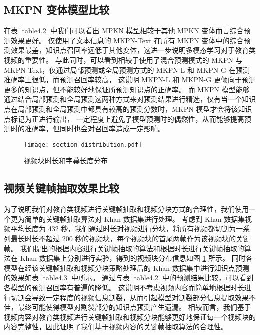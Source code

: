     \subsection{MKPN 变体模型比较}
    在表 \ref{table4.2} 中我们可以看出 MPKN 模型相较于其他 MPKN 变体而言综合预测效果更好。
    仅使用了文本信息的 MKPN-Text 在所有 MKPN 变体中的综合预测效果最差，知识点召回率远低于其他变体，这进一步说明多模态学习对于教育类视频的重要性。
    与此同时，可以看到相较于使用了混合预测模式的 MKPN 与 MKPN-Text，仅通过局部预测或全局预测方式的 MKPN-L 和 MKPN-G 在预测准确率上很低，而预测召回率较高，
    这说明 MKPN-L 和 MKPN-G 更倾向于预测更多的知识点，但不能较好地保证所预测知识点的正确率。
    而 MKPN 模型能够通过结合局部预测和全局预测这两种方式来对预测结果进行精选，仅有当一个知识点在局部预测和全局预测中都具有较高的预测分数时，MKPN 模型才会将该知识点标记为正进行输出，
    一定程度上避免了模型预测时的偶然性，从而能够提高预测时的准确率，但同时也会对召回率造成一定影响。

    \begin{figure}[htb]
        \centering
        \texttt{[image: section\_distribution.pdf]}
        \caption{视频块时长和字幕长度分布}
        \label{fig4.2}
    \end{figure}

    \subsection{视频关键帧抽取效果比较}
    为了说明我们对教育类视频进行关键帧抽取和视频分块方式的合理性，我们使用一个更为简单的关键帧抽取算法对 Khan 数据集进行处理。
    考虑到 Khan 数据集视频平均长度为 432 秒，我们通过时长对视频进行分块，将所有视频都切割为一系列最长时长不超过 200 秒的视频块，每个视频块的首尾两帧作为该视频块的关键帧。
    我们提出的根据内容进行关键帧抽取的算法和根据时长进行关键帧抽取的算法在 Khan 数据集上分别进行实验，得到的视频块分布信息如图 \ref{fig4.2} 所示。
    同时各模型在经该关键帧抽取和视频分块策略处理后的 Khan 数据集中进行知识点预测的效果如表 \ref{table4.3} 中所示。
    通过与表 \ref{table4.2} 中的预测结果比较，可以看到各模型的预测召回率有普遍的降低。
    这说明不考虑视频内容而简单地根据时长进行切割会导致一定程度的视频信息割裂，从而引起模型对割裂部分信息提取效果不佳，最终可能使得模型对割裂部分的知识点预测产生遗漏。
    相较而言，我们基于视频内容对教育类视频进行关键帧抽取和视频分块能够更好地保证每一个视频块的内容完整性，因此证明了我们基于视频内容的关键帧抽取算法的合理性。

